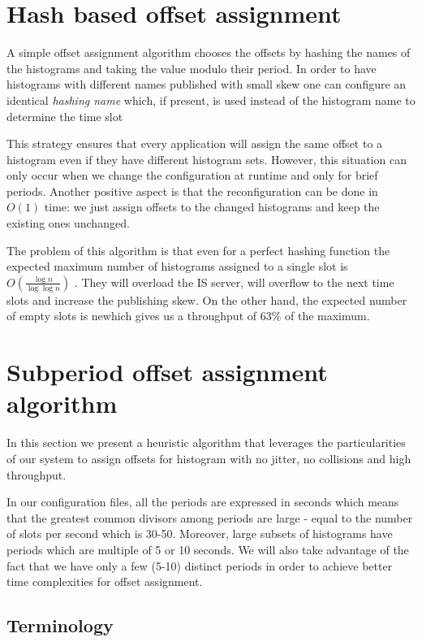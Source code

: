 \section*{Hash based offset assignment}

A simple offset assignment algorithm chooses the offsets by hashing the names of the histograms and taking the value modulo their period. In order to have histograms with different names published with small skew one can configure an identical \emph{hashing name} which, if present, is used instead of the histogram name to determine the time slot 

This strategy ensures that every application will assign the same offset to a histogram even if they have different histogram sets. However, this situation can only occur when we change the configuration at runtime and only for brief periods. Another positive aspect is that the reconfiguration can be done in $O(1)$ time: we just assign offsets to the changed histograms and keep the existing ones unchanged.

The problem of this algorithm is that even for a perfect hashing function the expected maximum number of histograms assigned to a single slot is $O(\frac{\log n}{\log \log n})$ \citep{mitzenmacher1996power}. They will overload the IS server, will overflow to the next time slots and increase the publishing skew. On the other hand, the expected number of empty slots is newhich gives us a throughput of 63\% of the maximum.

\section*{Subperiod offset assignment algorithm}

In this section we present a heuristic algorithm that leverages the particularities of our system to assign offsets for histogram with no jitter, no collisions and high throughput. 

In our configuration files, all the periods are expressed in seconds which means that the greatest common divisors among periods are large - equal to the number of slots per second which is 30-50. Moreover, large subsets of histograms have periods which are multiple of 5 or 10 seconds. We will also take advantage of the fact that we have only a few (5-10) distinct periods in order to achieve better time complexities for offset assignment.

\subsection*{Terminology}

